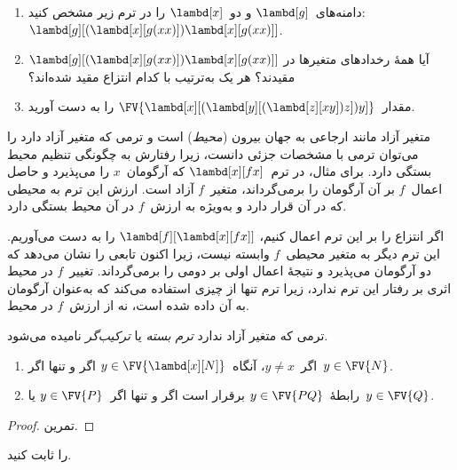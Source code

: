 \documentclass[../../../include/open-logic-section]{subfiles}
\begin{document}
\begin{prob}
  \begin{enumerate}
  \item دامنه‌های~$\lambd[g]$ و دو~$\lambd[x]$ را در ترم زیر مشخص کنید:
    $\lambd[g][(\lambd[x][g (x x)]) \lambd[x][g (x x)]]$.
  \item آیا همهٔ رخدادهای متغیرها در
    $\lambd[g][(\lambd[x][g (x x)]) \lambd[x][g (x x)]]$ مقیدند؟ هر
    یک به‌ترتیب با کدام انتزاع مقید شده‌اند؟
    \item مقدار~$\FV{\lambd[x][(\lambd[y][(\lambd[z][x y]) z]) y]}$
    را به دست آورید.
  \end{enumerate}
\end{prob}

\begin{explain}
متغیر آزاد مانند ارجاعی به جهان بیرون (\emph{محیط}) است و ترمی که متغیر
آزاد دارد را می‌توان ترمی با مشخصات جزئی دانست، زیرا رفتارش به چگونگی
تنظیم محیط بستگی دارد. برای مثال، در ترم~$\lambd[x][f x]$ که آرگومان~$x$
را می‌پذیرد و حاصل اعمال~$f$ بر آن آرگومان را برمی‌گرداند، متغیر~$f$ آزاد است. ارزش
این ترم به محیطی که در آن قرار دارد و به‌ویژه به ارزش~$f$ در آن محیط
بستگی دارد.

اگر انتزاع را بر این ترم اعمال کنیم، $\lambd[f][\lambd[x][f
    x]]$ را به دست می‌آوریم. این ترم دیگر به متغیر محیطی~$f$ وابسته نیست،
زیرا اکنون تابعی را نشان می‌دهد که دو آرگومان می‌پذیرد و نتیجهٔ اعمال
اولی بر دومی را برمی‌گرداند. تغییر~$f$ در محیط اثری بر رفتار این ترم
ندارد، زیرا ترم تنها از چیزی استفاده می‌کند که به‌عنوان آرگومان به آن
داده شده است، نه از ارزش~$f$ در محیط.
\end{explain}

\begin{defn}
  ترمی که متغیر آزاد ندارد \emph{ترم بسته} یا \emph{ترکیب‌گر} نامیده
  می‌شود.
\end{defn}

\begin{lem}
  \begin{enumerate}
    \item {} اگر~$y \neq x$، آنگاه~$y \in
      \FV{\lambd[x][N]}$ اگر و تنها اگر~$y \in \FV{N}$.
    \item {} رابطهٔ~$y \in \FV{PQ}$ برقرار است اگر
      و تنها اگر~$y \in \FV{P}$ یا~$y \in \FV{Q}$.
    \end{enumerate}
\end{lem}

\begin{proof}
  تمرین.
\end{proof}

\begin{prob}
   را ثابت کنید.
\end{prob}
\end{document}

